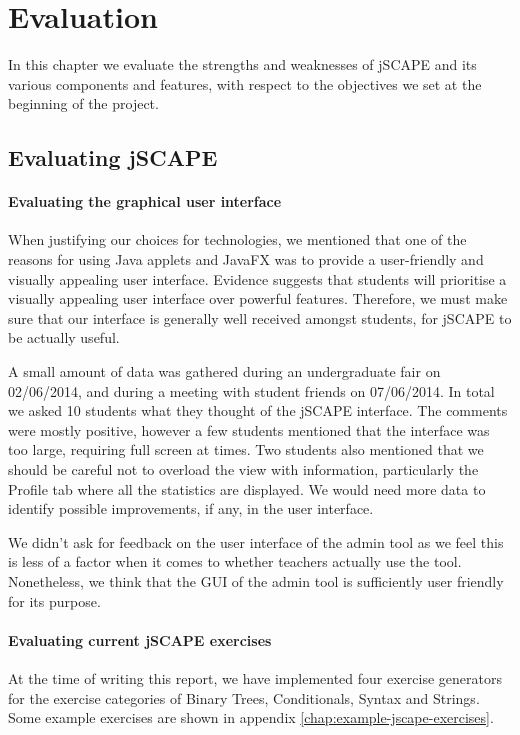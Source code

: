 \chapter{Evaluation}
\label{chap:evaluation}
In this chapter we evaluate the strengths and weaknesses of jSCAPE and its various components and features, with respect to the objectives we set at the beginning of the project.

\section{Evaluating jSCAPE}
\subsubsection{Evaluating the graphical user interface}
When justifying our choices for technologies, we mentioned that one of the reasons for using Java applets and JavaFX was to provide a user-friendly and visually appealing user interface. Evidence\cite{Interface-study} suggests that students will prioritise a visually appealing user interface over powerful features. Therefore, we must make sure that our interface is generally well received amongst students, for jSCAPE to be actually useful.\newline

A small amount of data was gathered during an undergraduate fair on 02/06/2014, and during a meeting with student friends on 07/06/2014. In total we asked 10 students what they thought of the jSCAPE interface. The comments were mostly positive, however a few students mentioned that the interface was too large, requiring full screen at times. Two students also mentioned that we should be careful not to overload the view with information, particularly the Profile tab where all the statistics are displayed. We would need more data to identify possible improvements, if any, in the user interface. \newline

We didn't ask for feedback on the user interface of the admin tool as we feel this is less of a factor when it comes to whether teachers actually use the tool. Nonetheless, we think that the GUI of the admin tool is sufficiently user friendly for its purpose.

\subsubsection{Evaluating current jSCAPE exercises}
At the time of writing this report, we have implemented four exercise generators for the exercise categories of Binary Trees, Conditionals, Syntax and Strings. Some example exercises are shown in appendix \ref{chap:example-jscape-exercises}. \newline

